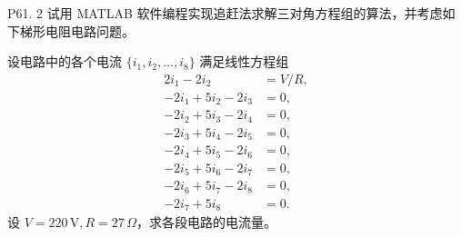 \documentclass[11pt, a4paper]{ctexart}
\begin{document}
\begin{problem}{P61. 2}
    试用 MATLAB 软件编程实现追赶法求解三对角方程组的算法，并考虑如下梯形电阻电路问题。

    设电路中的各个电流 $\{i_1, i_2, \dots, i_8\}$ 满足线性方程组
    \[
        \begin{aligned}
            2 i_1 - 2 i_2             &= V / R, \\
            -2 i_1 + 5 i_2 - 2 i_3    &= 0, \\
            -2 i_2 + 5 i_3 - 2 i_4    &= 0, \\
            -2 i_3 + 5 i_4 - 2 i_5    &= 0, \\
            -2 i_4 + 5 i_5 - 2 i_6    &= 0, \\
            -2 i_5 + 5 i_6 - 2 i_7    &= 0, \\
            -2 i_6 + 5 i_7 - 2 i_8    &= 0, \\
            -2 i_7 + 5 i_8            &= 0.
        \end{aligned}
    \]
    设 $V = 220\,\text{V}, R = 27\,\Omega$，求各段电路的电流量。
\end{problem}
\end{document}
